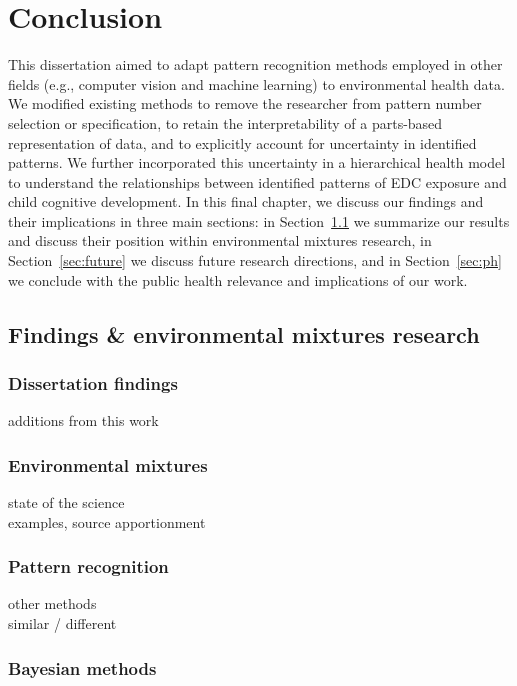 \chapter{Conclusion}\label{sec:conclusion}
\clearpage

This dissertation aimed to adapt pattern recognition methods employed in other fields (e.g., computer vision and machine learning) to environmental health data. We modified existing methods to remove the researcher from pattern number selection or specification, to retain the interpretability of a parts-based representation of data, and to explicitly account for uncertainty in identified patterns. We further incorporated this uncertainty in a hierarchical health model to understand the relationships between identified patterns of EDC exposure and child cognitive development. In this final chapter, we discuss our findings and their implications in three main sections: in Section~\ref{sec:summarize} we summarize our results and discuss their position within environmental mixtures research, in Section~\ref{sec:future} we discuss future research directions, and in Section~\ref{sec:ph} we conclude with the public health relevance and implications of our work.

\section{Findings \& environmental mixtures research}\label{sec:summarize}

\subsection{Dissertation findings}\label{sec:findings}
additions from this work

\subsection{Environmental mixtures}\label{sec:mixtures}
state of the science \\
examples, source apportionment

\subsection{Pattern recognition}\label{sec:patrec}
other methods \\
similar / different \\

\subsection{Bayesian methods}\label{sec:bayes}

